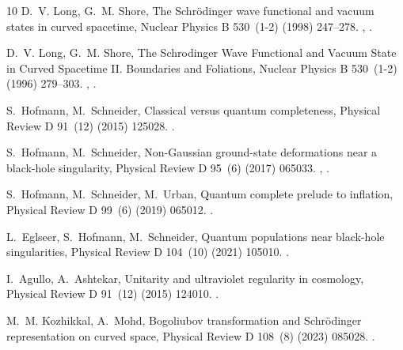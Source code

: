 \documentclass{elsarticle}%
\begin{document}
\begin{thebibliography}{10}
    D.~V. Long, G.~M. Shore, The {{Schr{\"o}dinger}} wave functional and vacuum states in curved spacetime, Nuclear Physics B 530~(1-2) (1998) 247--278.
    \newblock \href {http://arxiv.org/abs/hep-th/9605004} {}, \href {https://doi.org/10.1016/S0550-3213(98)00408-8} {}.
    
    D.~V. Long, G.~M. Shore, The {{Schrodinger Wave Functional}} and {{Vacuum State}} in {{Curved Spacetime II}}. {{Boundaries}} and {{Foliations}}, Nuclear Physics B 530~(1-2) (1996) 279--303.
    \newblock \href {http://arxiv.org/abs/gr-qc/9607032} {}, \href {https://doi.org/10.1016/S0550-3213(98)00409-X} {}.
    
    S.~Hofmann, M.~Schneider, Classical versus quantum completeness, Physical Review D 91~(12) (2015) 125028.
    \newblock \href {https://doi.org/10.1103/PhysRevD.91.125028} {}.
    
    S.~Hofmann, M.~Schneider, Non-{{Gaussian}} ground-state deformations near a black-hole singularity, Physical Review D 95~(6) (2017) 065033.
    \newblock \href {http://arxiv.org/abs/1611.07981} {}, \href {https://doi.org/10.1103/PhysRevD.95.065033} {}.
    
    S.~Hofmann, M.~Schneider, M.~Urban, Quantum complete prelude to inflation, Physical Review D 99~(6) (2019) 065012.
    \newblock \href {https://doi.org/10.1103/PhysRevD.99.065012} {}.
    
    L.~Eglseer, S.~Hofmann, M.~Schneider, Quantum populations near black-hole singularities, Physical Review D 104~(10) (2021) 105010.
    \newblock \href {https://doi.org/10.1103/PhysRevD.104.105010} {}.
    
    I.~Agullo, A.~Ashtekar, Unitarity and ultraviolet regularity in cosmology, Physical Review D 91~(12) (2015) 124010.
    \newblock \href {https://doi.org/10.1103/PhysRevD.91.124010} {}.
    
    M.~M. Kozhikkal, A.~Mohd, Bogoliubov transformation and {{Schr{\"o}dinger}} representation on curved space, Physical Review D 108~(8) (2023) 085028.
    \newblock \href {https://doi.org/10.1103/PhysRevD.108.085028} {}.
    

\end{thebibliography}
\end{document}
